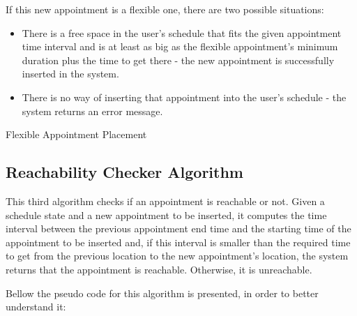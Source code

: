 \documentclass[12pt]{article}
\begin{document}
If this new appointment is a flexible one, there are two possible situations:
\begin{itemize}
    \item There is a free space in the user's schedule that fits the given appointment time interval and is at least as big as the flexible appointment's minimum duration plus the time to get there - the new appointment is successfully inserted in the system.
    \item There is no way of inserting that appointment into the user's schedule - the system returns an error message.
\end{itemize}

\begin{algorithm}[H]
\SetAlgoLined
{}
\caption{Flexible Appointment Placement}
\end{algorithm}

\subsection{Reachability Checker Algorithm}
This third algorithm checks if an appointment is reachable or not. Given a schedule state and a new appointment to be inserted, it computes the time interval between the previous appointment end time and the starting time of the appointment to be inserted and, if this interval is smaller than the required time to get from the previous location to the new appointment's location, the system returns that the appointment is reachable. Otherwise, it is unreachable.

Bellow the pseudo code for this algorithm is presented, in order to better understand it:

\begin{algorithm}[H]
\SetAlgoLined
{}
\end{algorithm}
\end{document}
